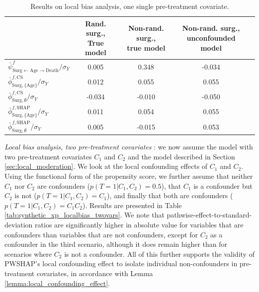 \begin{table}
\begin{tabular}{lcccc}
\hline
 & \makecell{Rand. surg., \\ True model}  & \makecell{Non-rand. surg.,\\ true model} & \makecell{Non-rand. surg.,\\ unconfounded model} \\ \hline
 $\bar{\psi}^f_{\text{Surg} \leftarrow \text{Age} \rightarrow \text{Death}} / \sigma_Y$ & 0.005 & 0.348 & -0.034 \\ \hline 
  $\bar{\phi}^{f,\text{CS}}_{\text{Surg}, \{\text{Age}\}} / \sigma_Y$ & 0.012 & 0.055 & 0.055 \\ \hline
    $\bar{\phi}^{f,\text{CS}}_{\text{Surg}, \emptyset} / \sigma_Y$ & -0.034 & -0.010 & -0.050 \\ \hline
  $\bar{\phi}^{f,\text{SHAP}}_{\text{Surg}, \{\text{Age}\}} / \sigma_Y$ & 0.011 & 0.054 & 0.055 \\ \hline
    $\bar{\phi}^{f,\text{SHAP}}_{\text{Surg}, \emptyset} / \sigma_Y$ & 0.005 & -0.015 & 0.053 \\ \hline
\end{tabular}
  \caption{Results on local bias analysis, one single pre-treatment covariate. %
  }%
\label{tab:synthetic_xp_localbias_singlevar}
\end{table}
    
\textit{Local bias analysis, two pre-treatment covariates} : we now assume the model with two pre-treatment covariates $C_1$ and $C_2$ and the model described in Section \ref{sec:local_moderation}. We look at the local confounding effects of $C_1$ and $C_2$. Using the functional form of the propensity score, we further assume that neither $C_1$ nor $C_2$ are confounders ($p(T=1|C_1,C_2) = 0.5$), that $C_1$ is a confounder but $C_2$ is not ($p(T=1|C_1,C_2) = C_1$), and finally that both are confounders ($p(T=1|C_1,C_2) = C_1C_2$). Results are presented in Table \ref{tab:synthetic_xp_localbias_twovars}. We note that pathwise-effect-to-standard-deviation ratios are significantly higher in absolute value for variables that are confounders than variables that are not confounders, except for $C_2$ as a confounder in the third scenario, although it does remain higher than for scenarios where $C_2$ is not a confounder. All of this further supports the validity of PWSHAP's local confounding effect to isolate individual non-confounders in pre-treatment covariates, in accordance with Lemma \ref{lemma:local_confounding_effect}.
    

